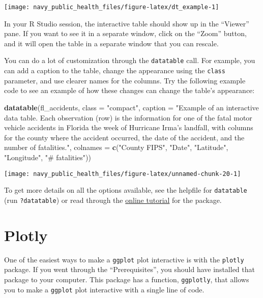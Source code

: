 \documentclass[]{tufte-book}
\newenvironment{Shaded}{}{}
\newcommand{\DataTypeTok}[1]{\textcolor[rgb]{0.56,0.13,0.00}{#1}}
\newcommand{\KeywordTok}[1]{\textcolor[rgb]{0.00,0.44,0.13}{\textbf{#1}}}
\newcommand{\NormalTok}[1]{#1}
\newcommand{\StringTok}[1]{\textcolor[rgb]{0.25,0.44,0.63}{#1}}
\begin{document}
\texttt{[image: navy\_public\_health\_files/figure-latex/dt\_example-1]}

In your R Studio session, the interactive table should show up
in the ``Viewer'' pane. If you want to see it in a separate window, click on the ``Zoom'' button,
and it will open the table in a separate window that you can rescale.

You can do a lot of customization through the \texttt{datatable} call. For example, you can
add a caption to the table, change the appearance using the \texttt{class} parameter, and
use clearer names for the columns. Try the following example code to see an example of how these
changes can change the table's appearance:

\begin{Shaded}
\begin{Highlighting}[]
\KeywordTok{datatable}\NormalTok{(fl_accidents, }\DataTypeTok{class =} \StringTok{"compact"}\NormalTok{, }\DataTypeTok{caption =} \StringTok{"Example of an interactive data table. Each observation (row) is the information for one of the fatal motor vehicle accidents in Florida the week of Hurricane Irma's landfall, with columns for the county where the accident occurred, the date of the accident, and the number of fatalities."}\NormalTok{, }
    \DataTypeTok{colnames =} \KeywordTok{c}\NormalTok{(}\StringTok{"County FIPS"}\NormalTok{, }\StringTok{"Date"}\NormalTok{, }\StringTok{"Latitude"}\NormalTok{, }
        \StringTok{"Longitude"}\NormalTok{, }\StringTok{"# fatalities"}\NormalTok{))}
\end{Highlighting}
\end{Shaded}

\texttt{[image: navy\_public\_health\_files/figure-latex/unnamed-chunk-20-1]}

To get more details on all the options available, see the helpfile for \texttt{datatable} (run \texttt{?datatable}) or read through the \href{}{online tutorial} for the package.

\hypertarget{plotly}{%
\section{Plotly}\label{plotly}}

One of the easiest ways to make a \texttt{ggplot} plot interactive is with the \texttt{plotly} package.
If you went through the ``Prerequisites'', you should have installed that package to your
computer. This package has a function, \texttt{ggplotly}, that allows you to make a \texttt{ggplot}
plot interactive with a single line of code.
\end{document}
